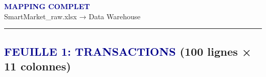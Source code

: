 \documentclass[11pt,a4paper,landscape]{article}
\begin{document}
\begin{center}
{\Huge \textbf{\textcolor{darkblue}{MAPPING COMPLET}}} \\
\vspace{0.3cm}
{\Large SmartMarket\_raw.xlsx → Data Warehouse} \\
\vspace{0.2cm}
\rule{\textwidth}{1pt}
\end{center}

\vspace{0.5cm}

\subsection*{\textcolor{darkblue}{FEUILLE 1: TRANSACTIONS} (100 lignes × 11 colonnes)}

\footnotesize
\end{document}
